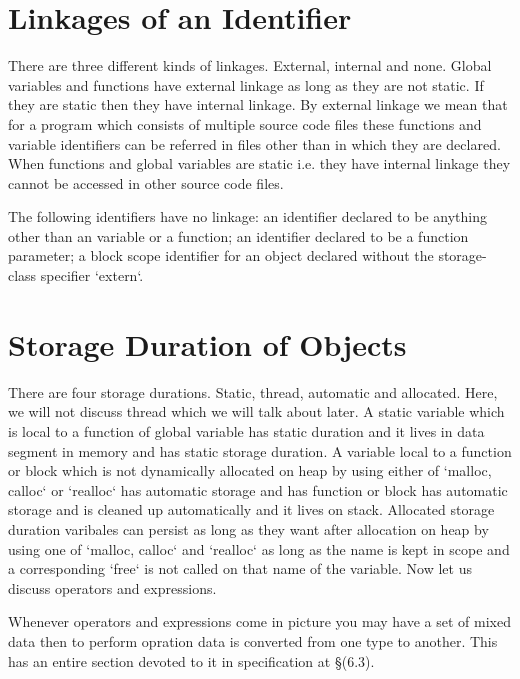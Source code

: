 \section{Linkages of an Identifier}
There are three different kinds of linkages. External, internal and
none. Global variables and functions have external linkage as long as they are
not static. If they are static then they have internal linkage. By external
linkage we mean that for a program which consists of multiple source code files
these functions and variable identifiers can be referred in files other than in
which they are declared. When functions and global variables are static
i.e. they have internal linkage they cannot be accessed in other source code
files.

The following identifiers have no linkage: an identifier declared to be
anything other than an variable or a function; an identifier declared to be a
function parameter; a block scope identifier for an object declared without the
storage-class specifier `extern`.

\section{Storage Duration of Objects}
There are four storage durations. Static, thread, automatic and
allocated. Here, we will not discuss thread which we will talk about later. A
static variable which is local to a function of global variable has static
duration and it lives in data segment in memory and has static storage
duration. A variable local to a function or block which is not dynamically
allocated on heap by using either of `malloc, calloc` or `realloc` has
automatic storage and has function or block has automatic storage and is
cleaned up automatically and it lives on stack. Allocated storage duration
varibales can persist as long as they want after allocation on heap by using
one of `malloc, calloc` and `realloc` as long as the name is kept
in scope and a corresponding `free` is not called on that name of the
variable. Now let us discuss operators and expressions.


Whenever operators and expressions come in picture you may have a set of mixed
data then to perform opration data is converted from one type to another. This
has an entire section devoted to it in specification at \S(6.3).